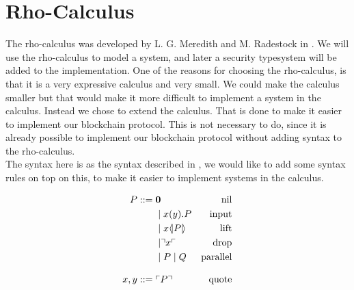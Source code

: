 \section{Rho-Calculus}\label{ch:rho-calculus}



The rho-calculus was developed by L. G. Meredith and M. Radestock in \citep{Meredith2005}. We will use the rho-calculus to model a system, and later a security typesystem will be added to the implementation. One of the reasons for choosing the rho-calculus, is that it is a very expressive calculus and very small. We could make the calculus smaller but that would make it more difficult to implement a system in the calculus. Instead we chose to extend the calculus. That is done to make it easier to implement our blockchain protocol. This is not necessary to do, since it is already possible to implement our blockchain protocol without adding syntax to the rho-calculus.\\
The syntax here is as the syntax described in \citep{Meredith2005}, we would like to add some syntax rules on top on this, to make it easier to implement systems in the calculus.

\begin{align*}
    P  ::= \; &  \mathbf{0} & \text{nil} \\
      & \mid x(y).P & \text{input} \\
      & \mid x \langle \! | P | \! \rangle & \text{lift} \\
      & \mid \urcorner x \ulcorner & \text{drop} \\
      & \mid P \mid Q & \text{parallel} \\[3mm]
    x,y ::= \; & \ulcorner P \urcorner & \text{quote}\\
\end{align*}

